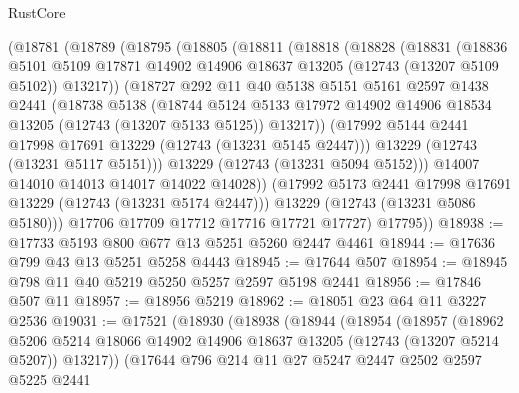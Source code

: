 \begin{lexlean}{RustCore}
\begin{coremodule}
    (@18781
      (@18789
        (@18795
          (@18805
            (@18811
              (@18818
                (@18828
                  (@18831
                    (@18836
                      @5101
                      @5109
                      @17871
                      @14902
                      @14906
                      @18637
                      @13205
                      (@12743 (@13207 @5109 @5102))
                      @13217))
                  (@18727
                    @292
                    @11
                    @40
                    @5138
                    @5151
                    @5161
                    @2597
                    @1438
                    @2441
                    (@18738
                      @5138
                      (@18744
                        @5124
                        @5133
                        @17972
                        @14902
                        @14906
                        @18534
                        @13205
                        (@12743 (@13207 @5133 @5125))
                        @13217))
                    (@17992 @5144 @2441 @17998 @17691 @13229 (@12743 (@13231 @5145 @2447)))
                    @13229
                    (@12743 (@13231 @5117 @5151)))
                  @13229
                  (@12743 (@13231 @5094 @5152)))
                @14007
                @14010
                @14013
                @14017
                @14022
                @14028))
            (@17992 @5173 @2441 @17998 @17691 @13229 (@12743 (@13231 @5174 @2447)))
            @13229
            (@12743 (@13231 @5086 @5180)))
          @17706
          @17709
          @17712
          @17716
          @17721
          @17727)
        @17795))
@18938 := @17733 @5193 @800 @677 @13 @5251 @5260 @2447 @4461
@18944 := @17636 @799 @43 @13 @5251 @5258 @4443
@18945 := @17644 @507
@18954 := @18945 @798 @11 @40 @5219 @5250 @5257 @2597 @5198 @2441
@18956 := @17846 @507 @11
@18957 := @18956 @5219
@18962 := @18051 @23 @64 @11 @3227 @2536
@19031 := @17521
    (@18930
      (@18938
        (@18944
          (@18954
            (@18957
              (@18962
                @5206
                @5214
                @18066
                @14902
                @14906
                @18637
                @13205
                (@12743 (@13207 @5214 @5207))
                @13217))
            (@17644
              @796
              @214
              @11
              @27
              @5247
              @2447
              @2502
              @2597
              @5225
              @2441

\end{coremodule}
\end{lexlean}
